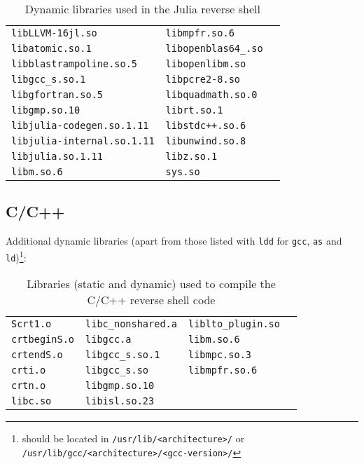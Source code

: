 \begin{longtable}{l l l}
\caption{Dynamic libraries used in the Julia reverse shell}\label{tab:julia-dpd} \\
\texttt{libLLVM-16jl.so} & \texttt{libmpfr.so.6} \\
\texttt{libatomic.so.1} & \texttt{libopenblas64\_.so} \\
\texttt{libblastrampoline.so.5} & \texttt{libopenlibm.so} \\
\texttt{libgcc\_s.so.1} & \texttt{libpcre2-8.so} \\
\texttt{libgfortran.so.5} & \texttt{libquadmath.so.0} \\
\texttt{libgmp.so.10} & \texttt{librt.so.1} \\
\texttt{libjulia-codegen.so.1.11} & \texttt{libstdc++.so.6} \\
\texttt{libjulia-internal.so.1.11} & \texttt{libunwind.so.8} \\
\texttt{libjulia.so.1.11} & \texttt{libz.so.1} \\
\texttt{libm.so.6} & \texttt{sys.so} \\
\end{longtable}


\subsection*{C/C++}


Additional dynamic libraries (apart from those listed with \texttt{ldd} for \texttt{gcc}, \texttt{as} and \texttt{ld})\footnote{should be located in \texttt{/usr/lib/<architecture>/} or \texttt{/usr/lib/gcc/<architecture>/<gcc-version>/}}:

\begin{longtable}{l l l l}
\caption{Libraries (static and dynamic) used to compile the C/C++ reverse shell code}\label{tab:c-dpd-lib} \\
\texttt{Scrt1.o} & \texttt{libc\_nonshared.a} & \texttt{liblto\_plugin.so} \\
\texttt{crtbeginS.o} & \texttt{libgcc.a} & \texttt{libm.so.6} \\
\texttt{crtendS.o} & \texttt{libgcc\_s.so.1} & \texttt{libmpc.so.3} \\
\texttt{crti.o} & \texttt{libgcc\_s.so} & \texttt{libmpfr.so.6} \\
\texttt{crtn.o} & \texttt{libgmp.so.10} &  \\
\texttt{libc.so} & \texttt{libisl.so.23} &  \\
\end{longtable}



